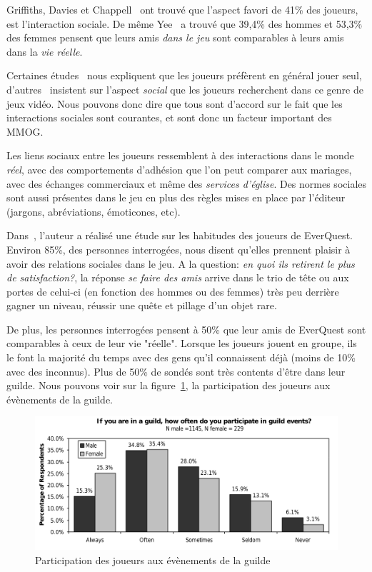 Griffiths, Davies et Chappell~\cite{BreakingSteretype} ont trouvé que l'aspect favori de 41\% des joueurs, est l'interaction sociale. De même Yee~\cite{1159988} a trouvé que 39,4\% des hommes et 53,3\% des femmes pensent que leurs amis \textit{dans le jeu} sont comparables à leurs amis dans la \textit{vie réelle}.
\par Certaines études~\cite{1124834,1031667} nous expliquent que les joueurs préfèrent en général jouer seul, d'autres~\cite{1159988,Jakobsson03thesopranos} insistent sur l'aspect \textit{social} que les joueurs recherchent dans ce genre de jeux vidéo. Nous pouvons donc dire que tous sont d'accord sur le fait que les interactions sociales sont courantes, et sont donc un facteur important des MMOG.
\par Les liens sociaux entre les joueurs ressemblent à des interactions dans le monde \textit{réel}, avec des comportements d'adhésion que l'on peut comparer aux mariages, avec des échanges commerciaux et même des \textit{services d'église}. Des normes sociales sont aussi présentes dans le jeu en plus des règles mises en place par l'éditeur (jargons, abréviations, émoticones, etc).

Dans~\cite{StudyEQ}, l'auteur a réalisé une étude sur les habitudes des joueurs de EverQuest. Environ 85\%, des personnes interrogées, nous disent qu'elles prennent plaisir à avoir des relations sociales dans le jeu. A la question: \textit{en quoi ils retirent le plus de satisfaction?}, la réponse \textit{se faire des amis} arrive dans le trio de tête ou aux portes de celui-ci (en fonction des hommes ou des femmes) très peu derrière gagner un niveau, réussir une quête et pillage d'un objet rare.
\par De plus, les personnes interrogées pensent à 50\% que leur amis de EverQuest sont comparables à ceux de leur vie "réelle". Lorsque les joueurs jouent en groupe, ils le font la majorité du temps avec des gens qu'il connaissent déjà (moins de 10\% avec des inconnus). Plus de 50\% de sondés sont très contents d'être dans leur guilde. Nous pouvons voir sur la figure~\ref{guildpres}, la participation des joueurs aux évènements de la guilde.
        \begin{figure}[!h]
        \centering
        \includegraphics[scale=0.75]{./Ressources/Images/studypres.png}
        \caption{Participation des joueurs aux évènements de la guilde}
        \label{guildpres}
        \end{figure}

